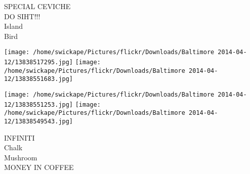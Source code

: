 \documentclass[10pt,letterpaper]{article}
\begin{document}
SPECIAL CEVICHE\\
DO SIHT!!!\\
Island\\
Bird
\pagebreak

\texttt{[image: /home/swickape/Pictures/flickr/Downloads/Baltimore 2014-04-12/13838517295.jpg]}
\texttt{[image: /home/swickape/Pictures/flickr/Downloads/Baltimore 2014-04-12/13838551683.jpg]}

\texttt{[image: /home/swickape/Pictures/flickr/Downloads/Baltimore 2014-04-12/13838551253.jpg]}
\texttt{[image: /home/swickape/Pictures/flickr/Downloads/Baltimore 2014-04-12/13838549543.jpg]}

INFINITI\\
Chalk\\
Mushroom\\
MONEY IN COFFEE
\pagebreak
\end{document}
